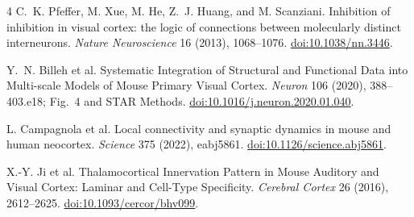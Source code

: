 \documentclass[11pt]{article}
\begin{document}

\clearpage
\begin{thebibliography}{4}
C.~K. Pfeffer, M. Xue, M. He, Z.~J. Huang, and M. Scanziani.
Inhibition of inhibition in visual cortex: the logic of connections between
molecularly distinct interneurons.
\emph{Nature Neuroscience} 16 (2013), 1068--1076.
\href{https://doi.org/10.1038/nn.3446}{doi:10.1038/nn.3446}.

Y.~N. Billeh et al.
Systematic Integration of Structural and Functional Data into Multi-scale
Models of Mouse Primary Visual Cortex.
\emph{Neuron} 106 (2020), 388--403.e18; Fig.~4 and STAR Methods.
\href{https://doi.org/10.1016/j.neuron.2020.01.040}{doi:10.1016/j.neuron.2020.01.040}.

L. Campagnola et al.
Local connectivity and synaptic dynamics in mouse and human neocortex.
\emph{Science} 375 (2022), eabj5861.
\href{https://doi.org/10.1126/science.abj5861}{doi:10.1126/science.abj5861}.

X.-Y. Ji et al.
Thalamocortical Innervation Pattern in Mouse Auditory and Visual Cortex:
Laminar and Cell-Type Specificity.
\emph{Cerebral Cortex} 26 (2016), 2612--2625.
\href{https://doi.org/10.1093/cercor/bhv099}{doi:10.1093/cercor/bhv099}.
\end{thebibliography}
\end{document}
